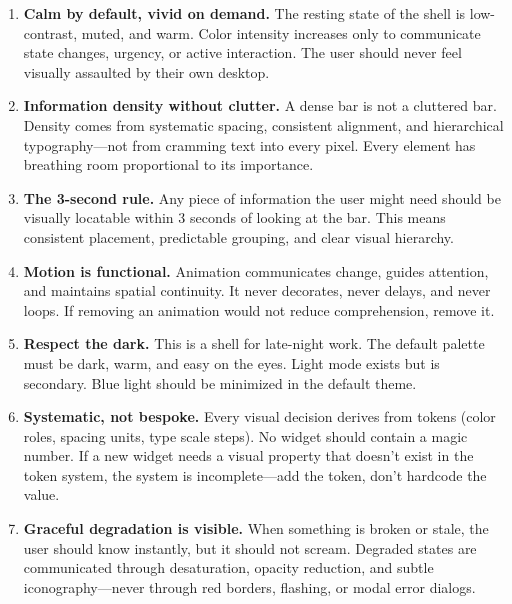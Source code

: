 \documentclass[11pt,a4paper]{article}
\begin{document}
\begin{principlebox}
\begin{enumerate}[leftmargin=1.5em, itemsep=4pt]
  \item \textbf{Calm by default, vivid on demand.} The resting state of the shell is low-contrast, muted, and warm. Color intensity increases only to communicate state changes, urgency, or active interaction. The user should never feel visually assaulted by their own desktop.

  \item \textbf{Information density without clutter.} A dense bar is not a cluttered bar. Density comes from systematic spacing, consistent alignment, and hierarchical typography---not from cramming text into every pixel. Every element has breathing room proportional to its importance.

  \item \textbf{The 3-second rule.} Any piece of information the user might need should be visually locatable within 3 seconds of looking at the bar. This means consistent placement, predictable grouping, and clear visual hierarchy.

  \item \textbf{Motion is functional.} Animation communicates change, guides attention, and maintains spatial continuity. It never decorates, never delays, and never loops. If removing an animation would not reduce comprehension, remove it.

  \item \textbf{Respect the dark.} This is a shell for late-night work. The default palette must be dark, warm, and easy on the eyes. Light mode exists but is secondary. Blue light should be minimized in the default theme.

  \item \textbf{Systematic, not bespoke.} Every visual decision derives from tokens (color roles, spacing units, type scale steps). No widget should contain a magic number. If a new widget needs a visual property that doesn't exist in the token system, the system is incomplete---add the token, don't hardcode the value.

  \item \textbf{Graceful degradation is visible.} When something is broken or stale, the user should know instantly, but it should not scream. Degraded states are communicated through desaturation, opacity reduction, and subtle iconography---never through red borders, flashing, or modal error dialogs.
\end{enumerate}
\end{principlebox}
\end{document}
